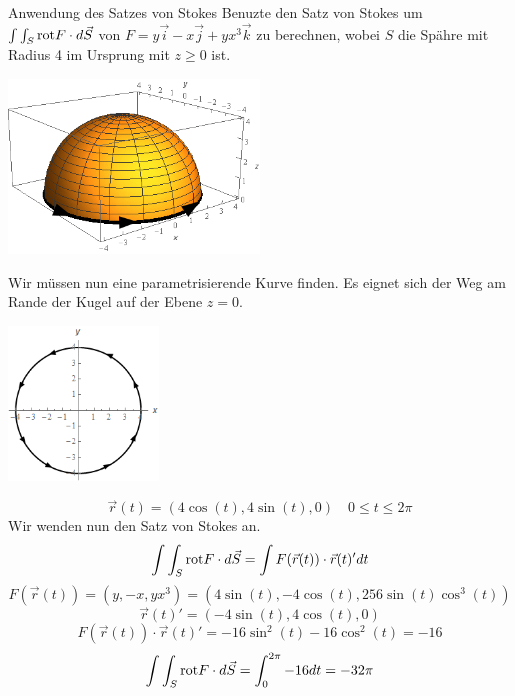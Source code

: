 \begin{Beispiel}{Anwendung des Satzes von Stokes}
    Benuzte den Satz von Stokes um $\int\int_S \text{rot} F \cdot d\vec{S}$ von $F=y\vec{i}-x\vec{j}+yx^3\vec{k}$ zu berechnen, wobei $S$ die Spähre mit Radius 4 im Ursprung mit $z\geq 0$ ist.
          \begin{center}
    \includegraphics[width=0.5\textwidth]{Dateien/Stokes1.png}
\end{center}
Wir müssen nun eine parametrisierende Kurve finden. Es eignet sich der Weg am Rande der Kugel auf der Ebene $z=0.$
          \begin{center}
    \includegraphics[width=0.3\textwidth]{Dateien/Stokes2.png}
    \end{center}
    $$\vec{r}(t)=(4\cos(t), 4\sin(t), 0) \quad 0\leq t \leq 2\pi$$
    Wir wenden nun den Satz von Stokes an.
    $$\int\int_S \text{rot} F\cdot d\vec{S}=\int F(\vec{r}(t))\cdot\vec{r}(t)'dt $$
    $$F(\vec{r}(t))=(y, -x, yx^3)=(4\sin(t),-4\cos(t), 256\sin(t)\cos^3(t))$$
    $$\vec{r}(t)'=(-4\sin(t), 4\cos(t),0)$$
    $$F(\vec{r}(t))\cdot \vec{r}(t)'=-16\sin^2(t)-16\cos^2(t)=-16$$
    $$\int\int_S \text{rot} F\cdot d\vec{S}=\int_0^{2\pi} -16dt = -32\pi$$
\end{Beispiel}
